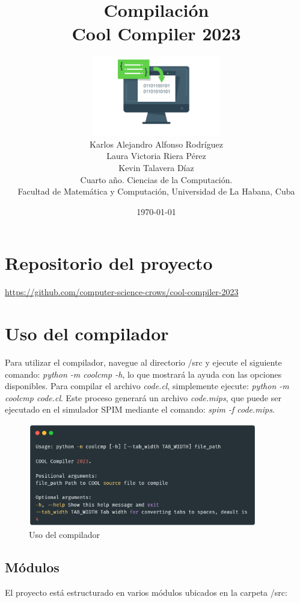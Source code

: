 \documentclass[10pt]{article} %
\title{\normalsize{Compilaci\'on}\\
	\Huge\bfseries Cool Compiler 2023 \\
} %
\author{%
	\includegraphics[width=15em]{logo.png}\\
	Karlos Alejandro Alfonso Rodríguez\\
	Laura Victoria Riera P\'erez\\
	Kevin Talavera Díaz \vspace{1em} \\
	\small Cuarto a\~no. Ciencias de la Computaci\'on. \\ %
	\small Facultad de Matem\'atica y Computaci\'on, Universidad de La Habana, Cuba \\ %
}
\date{\footnotesize \today } %
\begin{document}
	
	
	
	\maketitle
	
	
	\section*{Repositorio del proyecto}
	\begin{center}
		\url{https://github.com/computer-science-crows/cool-compiler-2023}
	\end{center}

	\section{Uso del compilador}
	
	Para utilizar el compilador, navegue al directorio /src y ejecute el siguiente comando: \textit{python -m coolcmp -h}, lo que mostrará la ayuda con las opciones disponibles. Para compilar el archivo \textit{code.cl}, simplemente ejecute: \textit{python -m coolcmp code.cl}. Este proceso generará un archivo \textit{code.mips}, que puede ser ejecutado en el simulador SPIM mediante el comando: \textit{spim -f code.mips}.
	
	\begin{figure}
		\centering
		\includegraphics[width=10cm]{usage}
		\caption{Uso del compilador}
	\end{figure}

	\subsection{M\'odulos}
	
	El proyecto está estructurado en varios módulos ubicados en la carpeta /src:
	
\end{document}
